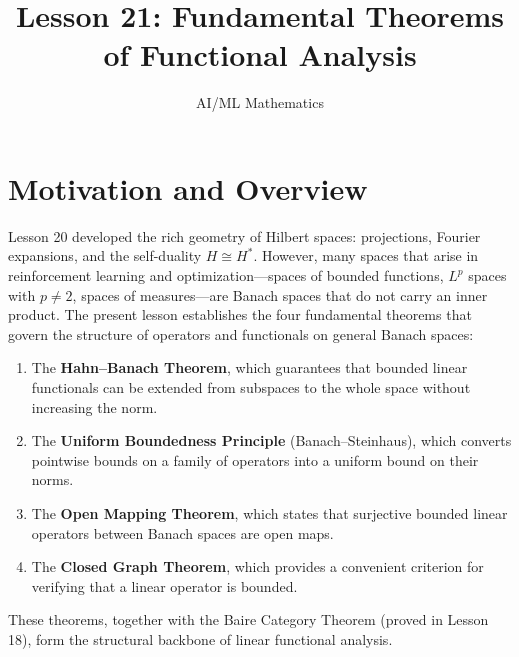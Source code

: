 \documentclass[11pt,a4paper]{article}
\title{Lesson 21: Fundamental Theorems of Functional Analysis}
\author{AI/ML Mathematics}
\date{}
\begin{document}
\maketitle
\tableofcontents
\newpage


\section{Motivation and Overview}
\label{sec:motivation}

Lesson 20 developed the rich geometry of Hilbert spaces: projections,
Fourier expansions, and the self-duality $H \cong H^*$. However, many
spaces that arise in reinforcement learning and optimization---spaces of
bounded functions, $L^p$ spaces with $p \neq 2$, spaces of
measures---are Banach spaces that do not carry an inner product. The
present lesson establishes the four fundamental theorems that govern the
structure of operators and functionals on general Banach spaces:
\begin{enumerate}[leftmargin=2em,nosep]
    \item The \textbf{Hahn--Banach Theorem}, which guarantees that
          bounded linear functionals can be extended from subspaces to
          the whole space without increasing the norm.
    \item The \textbf{Uniform Boundedness Principle} (Banach--Steinhaus),
          which converts pointwise bounds on a family of operators into a
          uniform bound on their norms.
    \item The \textbf{Open Mapping Theorem}, which states that surjective
          bounded linear operators between Banach spaces are open maps.
    \item The \textbf{Closed Graph Theorem}, which provides a convenient
          criterion for verifying that a linear operator is bounded.
\end{enumerate}

These theorems, together with the Baire Category Theorem (proved in
Lesson 18), form the structural backbone of linear functional analysis.
\end{document}
